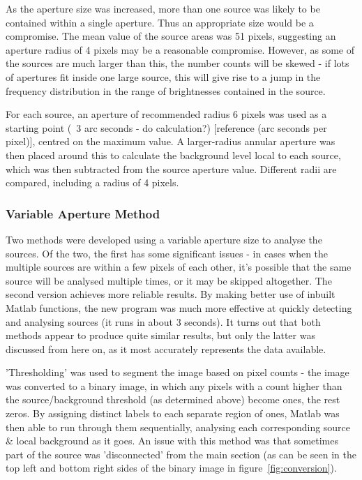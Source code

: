 \documentclass[a4paper,11pt,twoside]{article}
\begin{document}
As the aperture size was increased, more than one source was likely to be contained within a single aperture. Thus an appropriate size would be a compromise. The mean value of the source areas was 51 pixels, suggesting an aperture radius of 4 pixels may be a reasonable compromise. However, as some of the sources are much larger than this, the number counts will be skewed - if lots of apertures fit inside one large source, this will give rise to a jump in the frequency distribution in the range of brightnesses contained in the source.

For each source, an aperture of recommended radius 6 pixels\cite{clem} was used as a starting point (~3 arc seconds - do calculation?) [reference (arc seconds per pixel)], centred on the maximum value. A larger-radius annular aperture was then placed around this to calculate the background level local to each source, which was then subtracted from the source aperture value. 
Different radii are compared, including a radius of 4 pixels.

\subsubsection{Variable Aperture Method}

Two methods were developed using a variable aperture size to analyse the sources.
Of the two, the first has some significant issues - in cases when the multiple sources are within a few pixels of each other, it's possible that the same source will be analysed multiple times, or it may be skipped altogether. The second version achieves more reliable results. By making better use of inbuilt Matlab functions, the new program was much more effective at quickly detecting and analysing sources (it runs in about 3 seconds). It turns out that both methods appear to produce quite similar results, but only the latter was discussed from here on, as it most accurately represents the data available.

'Thresholding' was used to segment the image based on pixel counts - the image was converted to a binary image, in which any pixels with a count higher than the source/background threshold (as determined above) become ones, the rest zeros. By assigning distinct labels to each separate region of ones, Matlab was then able to run through them sequentially, analysing each corresponding source \& local background as it goes.
An issue with this method was that sometimes part of the source was 'disconnected' from the main section (as can be seen in the top left and bottom right sides of the binary image in figure~\ref{fig:conversion}).
\end{document}
